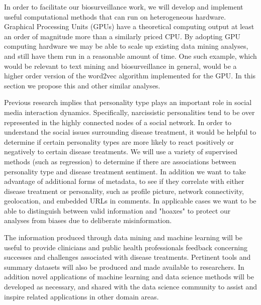 In order to facilitate our biosurveillance work, we will develop and implement useful computational methods that can run on heterogeneous hardware. Graphical Processing Units (GPUs) have a theoretical computing output at least an order of magnitude more than a similarly priced CPU. By adopting GPU computing hardware we may be able to scale up existing data mining analyses, and still have them run in a reasonable amount of time. One such example, which would be relevant to text mining and biosurveillance in general, would be a higher order version of the word2vec algorithm implemented for the GPU. In this section we propose this and other similar analyses.



Previous research implies that personality type plays an important role in social media interaction dynamics. Specifically, narcissistic personalities tend to be over represented in the highly connected nodes of a social network. In order to understand the social issues surrounding disease treatment, it would be helpful to determine if certain personality types are more likely to react positively or negatively to certain disease treatments. We will use a variety of supervised methods (such as regression) to determine if there are associations between personality type and disease treatment sentiment. In addition we want to take advantage of additional forms of metadata, to see if they correlate with either disease treatment or personality, such as profile picture, network connectivity, geolocation, and embedded URLs in comments. In applicable cases we want to be able to distinguish between valid information and "hoaxes" to protect our analyses from biases due to deliberate misinformation.

The information produced through data mining and machine learning will be useful to provide clinicians and public health professionals feedback concerning successes and challenges associated with disease treatments. Pertinent tools and summary datasets will also be produced and made available to researchers. In addition novel applications of machine learning and data science methods will be developed as necessary, and shared with the data science community to assist and inspire related applications in other domain areas.
